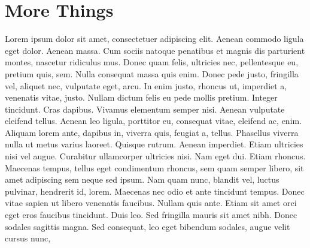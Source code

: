 \chapter{More Things}

Lorem ipsum dolor sit amet, consectetuer adipiscing elit. Aenean commodo ligula 
eget dolor. Aenean massa. Cum sociis natoque penatibus et magnis dis parturient 
montes, nascetur ridiculus mus. Donec quam felis, ultricies nec, pellentesque 
eu, pretium quis, sem. Nulla consequat massa quis enim. Donec pede justo, 
fringilla vel, aliquet nec, vulputate eget, arcu. In enim justo, rhoncus ut, 
imperdiet a, venenatis vitae, justo. Nullam dictum felis eu pede mollis pretium. 
Integer tincidunt. Cras dapibus. Vivamus elementum semper nisi. Aenean vulputate 
eleifend tellus. Aenean leo ligula, porttitor eu, consequat vitae, eleifend ac, 
enim. Aliquam lorem ante, dapibus in, viverra quis, feugiat a, tellus. Phasellus 
viverra nulla ut metus varius laoreet. Quisque rutrum. Aenean imperdiet. Etiam 
ultricies nisi vel augue. Curabitur ullamcorper ultricies nisi. Nam eget dui. 
Etiam rhoncus. Maecenas tempus, tellus eget condimentum rhoncus, sem quam semper 
libero, sit amet adipiscing sem neque sed ipsum. Nam quam nunc, blandit vel, 
luctus pulvinar, hendrerit id, lorem. Maecenas nec odio et ante tincidunt 
tempus. Donec vitae sapien ut libero venenatis faucibus. Nullam quis ante. Etiam 
sit amet orci eget eros faucibus tincidunt. Duis leo. Sed fringilla mauris sit 
amet nibh. Donec sodales sagittis magna. Sed consequat, leo eget bibendum 
sodales, augue velit cursus nunc, 

 